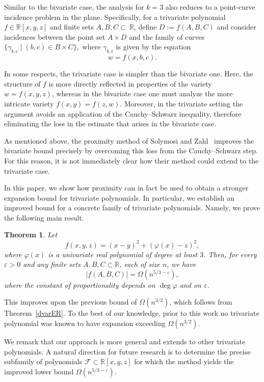 \documentclass[letterpaper, reqno,11pt]{article}
\newcommand{\RR}{\mathbb{R}}
\newcommand{\eps}{\varepsilon}
\newtheorem{thm}{Theorem}%
\theoremstyle{definition}
\theoremstyle{remark}
\begin{document}
Similar to the bivariate case, the analysis for $k=3$ also reduces to a point-curve incidence problem in the plane. 
Specifically, for a trivariate polynomial $f\in \RR[x,y,z]$ and  finite sets $A,B,C\subset~\RR$, define $D:=f(A,B,C)$ and consider incidences between the point set $A\times D$ and the family of curves 
$
\{\gamma_{b,c}\mid (b,c)\in B\times C\},
$
where $\gamma_{b,c}$ is given by the equation 
$$
w=f(x,b,c).
$$



In some respects, the trivariate case is simpler than the bivariate one. Here, the structure of $f$ is more directly reflected in properties of  the variety 
$w=f(x,y,z)$, whereas in the bivariate case one must analyze the more intricate variety $f(x,y)=f(z,w)$. Moreover, in the trivariate setting the argument avoids
an application of the Cauchy--Schwarz inequality, therefore eliminating the loss in the estimate that arises in the bivariate case. 

As mentioned above, the proximity method of Solymosi and Zahl~\cite{SolZah} improves the bivariate bound precisely by overcoming this loss from the Cauchy--Schwarz step. For this reason, it is not immediately clear how their method could extend to the trivariate case.

In this paper, we show how proximity can in fact be used to obtain a stronger expansion bound for trivariate polynomials. In particular, we establish an improved bound for a concrete family of trivariate polynomials. Namely, we prove the following main result.

\begin{thm}\label{main}
Let 
$$
f(x,y,z)=(x-y)^2+(\varphi(x)-z)^2,
$$
where $\varphi(x)$ is a univariate real polynomial of degree at least $3$. 
Then, for every $\eps>0$ and any finite sets $A,B,C\subset\RR$, each of size $n$, we have
$$
|f(A,B,C)|=\Omega(n^{5/3-\eps}),
$$
where the constant of proportionality depends on $\deg\varphi$ and on $\eps$. 
\end{thm}
This improves upon the previous bound of $\Omega(n^{3/2})$,
which follows from Theorem~\ref{dvarER}. 
To the best of our knowledge, prior to this work no trivariate polynomial was known to have expansion exceeding $\Omega(n^{3/2})$. 

We remark that our approach is more general 
and extends to other trivariate polynomials.
A natural direction for future research is to determine the precise subfamily of polynomials $\mathcal{F}\subset \mathbb{R}[x,y,z]$ for which the method yields the improved lower bound $\Omega(n^{5/3-\eps})$.
\end{document}
